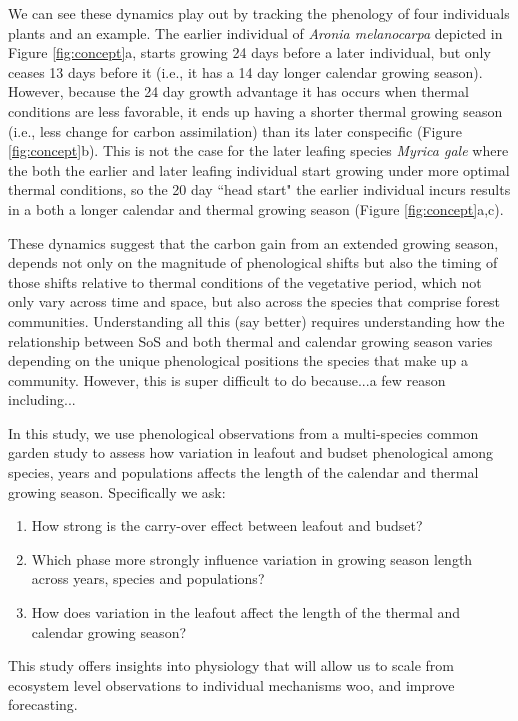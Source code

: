 \documentclass[12 pt]{article}
\begin{document}
We can see these dynamics play out by tracking the phenology of four individuals plants and an example. The earlier individual of \emph{Aronia melanocarpa} depicted in Figure \ref{fig:concept}a, starts growing 24 days before a later individual, but only ceases 13 days before it (i.e., it has a 14 day longer calendar growing season). However, because the 24 day growth advantage it has occurs when thermal conditions are less favorable, it ends up having a shorter thermal growing season (i.e., less change for carbon assimilation) than its later conspecific (Figure \ref{fig:concept}b). This is not the case for the later leafing species \emph{Myrica gale} where the both the earlier and later leafing individual start growing under more optimal thermal conditions, so the 20 day ``head start" the earlier individual incurs results in a both a longer calendar and thermal growing season (Figure \ref{fig:concept}a,c). 

These dynamics suggest that the carbon gain from an extended growing season, depends not only on the magnitude of phenological shifts but also the timing of those shifts relative to thermal conditions of the vegetative period, which not only vary across time and space, but also across the species that comprise forest communities. Understanding all this (say better) requires  understanding how the relationship between SoS and both thermal and calendar growing season varies depending on the unique phenological positions the species that make up a community. However, this is super difficult to do because...a few reason including...  

In this study, we use phenological observations from a multi-species common garden study to 
assess how variation in leafout and  budset phenological among species, years and populations affects the length of the calendar and thermal growing season. Specifically we ask:

\begin{enumerate}
\item How strong is the carry-over effect between leafout and budset? 
\item Which phase more strongly influence variation in growing season length across years, species and populations?
\item How does variation in the leafout affect the length of the thermal and calendar growing season?
\end{enumerate}

This study offers insights into physiology that will allow us to scale from ecosystem level observations to individual mechanisms woo, and improve forecasting.
\end{document}
